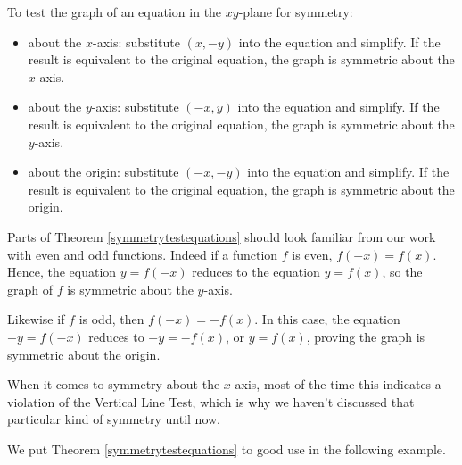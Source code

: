 \colorbox{ResultColor}{\bbm

\begin{thm} \label{symmetrytestequations} 

To test the graph of an equation in the $xy$-plane for symmetry:

\begin{itemize}

\item about the $x$-axis:  substitute $(x,-y)$ into the equation and simplify. If the result is equivalent to the original equation, the graph is symmetric about the $x$-axis.

\item about the $y$-axis:  substitute $(-x,y)$ into the equation and simplify. If the result is equivalent to the original equation, the graph is symmetric about the $y$-axis.

\item about the origin:  substitute $(-x,-y)$ into the equation and simplify. If the result is equivalent to the original equation, the graph is symmetric about the origin.

\end{itemize}

\end{thm}


\ebm}

\smallskip

Parts of Theorem  \ref{symmetrytestequations} should look familiar from our work with even and odd functions.  Indeed if a function $f$ is even,   $f(-x) = f(x)$.  Hence, the equation $y=f(-x)$ reduces to the equation $y=f(x)$, so the graph of $f$ is symmetric about the $y$-axis. 

\smallskip

 Likewise if $f$ is odd, then  $f(-x) = -f(x)$.  In this case, the equation  $-y = f(-x)$ reduces to  $-y = -f(x)$, or $y = f(x)$, proving the graph is symmetric about the origin.

\smallskip

When it comes to symmetry about the $x$-axis, most of the time this indicates a violation of the Vertical Line Test, which is why we haven't discussed that particular kind of symmetry until now.  

\smallskip

We put Theorem \ref{symmetrytestequations} to good use in the following example.

